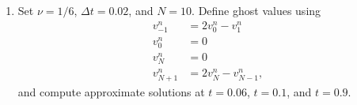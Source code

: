 \documentclass[11pt]{article}
\newcommand{\dt}{\Delta t}
\begin{document}
\begin{enumerate}
\begin{enumerate}
       
      
    \item {\color{blue}Set} $\nu=1/6$, $\dt=0.02$, {\color{blue}and} $N=10$. {\color{blue}Define ghost values using }
      \begin{align*}
        v_{-1}^n & = 2v_0^n-v_1^n\\
        v_{0}^n & = 0\\
        v_{N}^n & = 0\\
        v_{N+1}^n & = 2v_{N}^n-v_{N-1}^n,
      \end{align*}
      {\color{blue}and compute approximate solutions at }$t=0.06$, $t=0.1$, {\color{blue}and }$t=0.9$.\\
      

\end{enumerate}
\end{enumerate}
\end{document}
